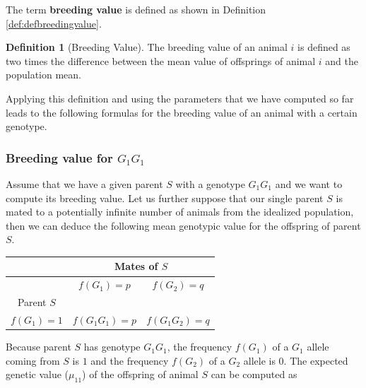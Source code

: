 \documentclass[
]{book}
\theoremstyle{definition}
\newtheorem{definition}{Definition}[chapter]
\theoremstyle{definition}
\theoremstyle{definition}
\theoremstyle{remark}
\begin{document}
The term \textbf{breeding value} is defined as shown in Definition \ref{def:defbreedingvalue}.

\begin{definition}[Breeding Value]
\protect\hypertarget{def:defbreedingvalue}{}{\label{def:defbreedingvalue} {} }The breeding value of an animal \(i\) is defined as two times the difference between the mean value of offsprings of animal \(i\) and the population mean.
\end{definition}

Applying this definition and using the parameters that we have computed so far leads to the following formulas for the breeding value of an animal with a certain genotype.

\hypertarget{breeding-value-for-g_1g_1}{%
\subsubsection{\texorpdfstring{Breeding value for \(G_1G_1\)}{Breeding value for G\_1G\_1}}\label{breeding-value-for-g_1g_1}}

Assume that we have a given parent \(S\) with a genotype \(G_1G_1\) and we want to compute its breeding value. Let us further suppose that our single parent \(S\) is mated to a potentially infinite number of animals from the idealized population, then we can deduce the following mean genotypic value for the offspring of parent \(S\).

\vspace{5ex}

\begin{center}
\begin{tabular}{|c|c|c|}
\hline
& \multicolumn{2}{|c|}{Mates of $S$} \\
\hline
& $f(G_1) = p$       &  $f(G_2) = q$   \\
\hline
Parent $S$       &                    &                 \\
\hline
$f(G_1) = 1$ &  $f(G_1G_1) = p$   &  $f(G_1G_2) = q$\\
\hline
\end{tabular}
\end{center}

\vspace{5ex}

Because parent \(S\) has genotype \(G_1G_1\), the frequency \(f(G_1)\) of a \(G_1\) allele coming from \(S\) is \(1\) and the frequency \(f(G_2)\) of a \(G_2\) allele is 0. The expected genetic value (\(\mu_{11}\)) of the offspring of animal \(S\) can be computed as
\end{document}
